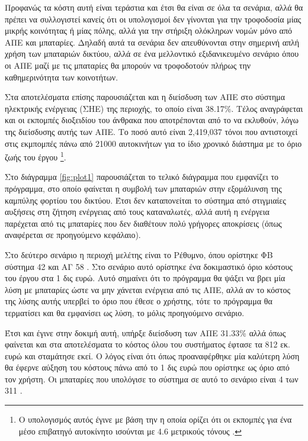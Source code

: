 \documentclass[12pt]{report}
\begin{document}
Προφανώς τα κόστη αυτή είναι τεράστια και έτσι θα είναι σε όλα τα σενάρια, αλλά θα πρέπει να συλλογιστεί κανείς ότι οι υπολογισμοί δεν γίνονται για την τροφοδοσία μίας μικρής κοινότητας ή μίας πόλης, αλλά για την στήριξη ολόκληρων
νομών μόνο από ΑΠΕ και μπαταρίες. Δηλαδή αυτά τα σενάρια δεν απευθύνονται στην σημερινή απλή χρήση των μπαταριών δικτύου, αλλά σε ένα μελλοντικό εξιδανικευμένο σενάριο όπου οι ΑΠΕ μαζί με τις μπαταρίες θα μπορούν να τροφοδοτούν
πλήρως την καθημερινότητα των κοινοτήτων.

Στα αποτελέσματα επίσης παρουσιάζεται και η διείσδυση των ΑΠΕ στο σύστημα ηλεκτρικής ενέργειας (ΣΗΕ) της περιοχής, το οποίο είναι 38.17\%. Τέλος αναγράφεται και οι εκπομπές διοξειδίου του άνθρακα που αποτρέπονται από το να
εκλυθούν, λόγω της διείσδυσης αυτής των ΑΠΕ. Το ποσό αυτό είναι 2,419,037 τόνοι {} που αντιστοιχεί στις εκμπομπές πάνω από 21000 αυτοκινήτων για το ίδιο χρονικό διάστημα με το όριο ζωής του έργου
\footnote{Ο υπολογισμός αυτός έγινε με βάση την {} η οποία ορίζει ότι οι εκπομπές {} για ένα μέσο επιβατηγό αυτοκίνητο ισούνται με 4.6 
μετρικούς τόνους {}.}.

Στο διάγραμμα \ref{fig:plot1} παρουσιάζεται το τελικό διάγραμμα που εμφανίζει το πρόγραμμα, στο οποίο φαίνεται η συμβολή των μπαταριών στην εξομάλυνση της καμπύλης φορτίου του δικτύου. Έτσι δεν καταπονείται το σύστημα από
στιγμιαίες αυξήσεις στη ζήτηση ενέργειας από τους καταναλωτές, αλλά αυτή η ενέργεια παρέχεται από τις μπαταρίες που δεν διαθέτουν πολύ γρήγορες αποκρίσεις (όπως αναφέρεται σε προηγούμενο κεφάλαιο).

\begin{center}
\end{center}

Στο δεύτερο σενάριο η περιοχή μελέτης είναι το Ρέθυμνο, όπου ορίστηκε ΦΒ σύστημα 42 {} και ΑΓ 58 {}. Στο σενάριο αυτό ορίστηκε ένα δοκιμαστικό όριο κόστους του έργου στα 1 δις ευρώ. Αυτό σημαίνει ότι
το πρόγραμμα θα ψάξει να βρει μία λύση με μπαταρίες ώστε να μην χάνεται ενέργεια από τις ΑΠΕ, αλλά αν το κόστος της λύσης αυτής υπερβεί το όριο που έθεσε ο χρήστης, τότε το πρόγραμμα θα τερματίσει και θα εμφανίσει ως λύση, το
μόλις προηγούμενο σενάριο.

Έτσι και έγινε στην δοκιμή αυτή, υπήρξε διείσδυση των ΑΠΕ 31.33\% αλλά όπως φαίνεται και στα αποτελέσματα το κόστος όλου του συστήματος έφτασε τα 812 εκ. ευρώ και σταμάτησε εκεί. Ο λόγος είναι ότι όπως προαναφέρθηκε μία καλύτερη
λύση θα έφερνε αύξηση του κόστους πάνω από το 1 δις ευρώ που ορίστηκε ως όριο από τον χρήστη. Οι μπαταρίες που υπολόγισε το σύστημα σε αυτό το σενάριο είναι 4 {} των 311 {}.
\end{document}
